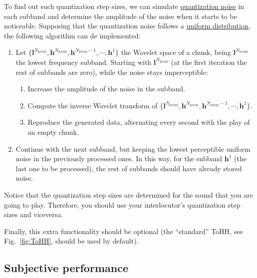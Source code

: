 To find out such quantization step sizes, we can simulate
\href{https://en.wikipedia.org/wiki/Quantization_(signal_processing)}{quantization
  noise} in each subband and determine the amplitude of the noise when
it starts to be noticeable. Supposing that the quantization noise
follows a
\href{https://en.wikipedia.org/wiki/Continuous_uniform_distribution}{uniform
  distribution}, the following algorithm can de implemented:

\begin{enumerate}
\item Let $\{{\mathbf l}^{N_{\text{levels}}}, {\mathbf
  h}^{N_{\text{levels}}}, {\mathbf h}^{N_{\text{levels}}-1},\cdots,
  {\mathbf h}^1\}$ the Wavelet space of a chunk, being ${\mathbf
    l}^{N_{\text{levels}}}$ the lowest frequency subband. Starting
  with ${\mathbf l}^{N_{\text{levels}}}$ (at the first iteration the
  rest of subbands are zero), while the noise stays imperceptible:
  \begin{enumerate}
  \item Increase the amplitude of the noise in the subband.
  \item Compute the inverse Wavelet transform of $\{{\mathbf
    l}^{N_{\text{levels}}}, {\mathbf h}^{N_{\text{levels}}}, {\mathbf
    h}^{N_{\text{levels}}-1},\cdots, {\mathbf h}^1\}$.
  \item Reproduce the generated data, alternating every second with
    the play of an empty chunk.
  \end{enumerate}
  \item Continue with the next subband, but keeping the lowest
    perceptible uniform noise in the previously processed ones. In
    this way, for the subband ${\mathbf h}^1$ (the last one to be
    processed), the rest of subbands should have already stored noise.
\end{enumerate}

Notice that the quantization step sizes are determined for the sound
that you are going to play. Therefore, you should use your
interlocutor's quantization step sizes and viceversa.

Finally, this extra functionality should be optional (the ``standard''
ToHH, see Fig.~\ref{fig:ToHH}, should be used by default).

\subsection{Subjective performance}

